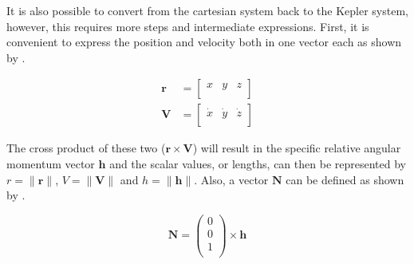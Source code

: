 
\noindent
It is also possible to convert from the cartesian system back to the Kepler system, however, this requires more steps and intermediate expressions. First, it is convenient to express the position and velocity both in one vector each as shown by .

\begin{equation}\label{eq:randvvectors}
\begin{split}
\mathbf{r}&=\begin{bmatrix}
x & y & z\\
\end{bmatrix}\\
\mathbf{V}&=\begin{bmatrix}
\dot{x} & \dot{y} & \dot{z}\\
\end{bmatrix}
\end{split}
\end{equation}

\noindent
The cross product of these two ($\mathbf{r}\times\mathbf{V}$) will result in the specific relative angular momentum vector $\mathbf{h}$ and the scalar values, or lengths, can then be represented by $r=\|\mathbf{r}\|$, $V=\|\mathbf{V}\|$ and $h=\|\mathbf{h}\|$. Also, a vector $\mathbf{N}$ can be defined as shown by \citep{noomen2013basic}.

\begin{equation}\label{eq:N}
\mathbf{N}=\begin{pmatrix}
0\\
0\\
1\\
\end{pmatrix}
\times
\mathbf{h}
\end{equation}

